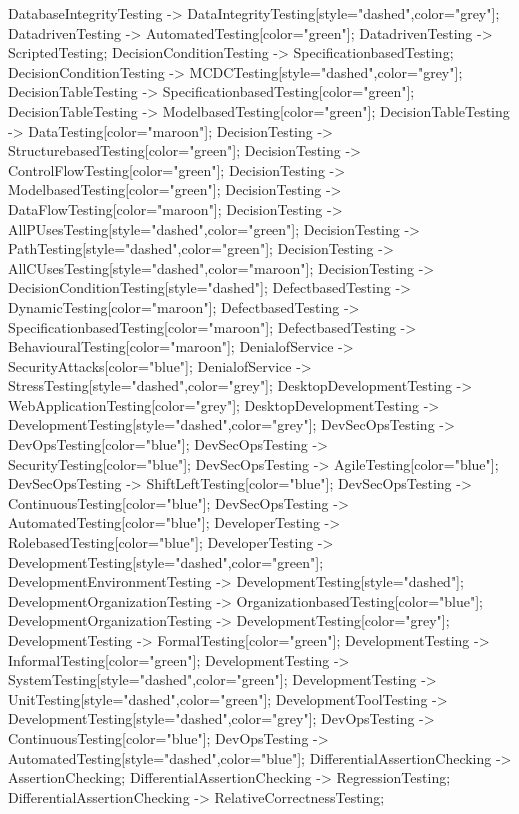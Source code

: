 \documentclass{article}
\begin{document}
{DatabaseIntegrityTesting -> DataIntegrityTesting[style="dashed",color="grey"];
DatadrivenTesting -> AutomatedTesting[color="green"];
DatadrivenTesting -> ScriptedTesting;
DecisionConditionTesting -> SpecificationbasedTesting;
DecisionConditionTesting -> MCDCTesting[style="dashed",color="grey"];
DecisionTableTesting -> SpecificationbasedTesting[color="green"];
DecisionTableTesting -> ModelbasedTesting[color="green"];
DecisionTableTesting -> DataTesting[color="maroon"];
DecisionTesting -> StructurebasedTesting[color="green"];
DecisionTesting -> ControlFlowTesting[color="green"];
DecisionTesting -> ModelbasedTesting[color="green"];
DecisionTesting -> DataFlowTesting[color="maroon"];
DecisionTesting -> AllPUsesTesting[style="dashed",color="green"];
DecisionTesting -> PathTesting[style="dashed",color="green"];
DecisionTesting -> AllCUsesTesting[style="dashed",color="maroon"];
DecisionTesting -> DecisionConditionTesting[style="dashed"];
DefectbasedTesting -> DynamicTesting[color="maroon"];
DefectbasedTesting -> SpecificationbasedTesting[color="maroon"];
DefectbasedTesting -> BehaviouralTesting[color="maroon"];
DenialofService -> SecurityAttacks[color="blue"];
DenialofService -> StressTesting[style="dashed",color="grey"];
DesktopDevelopmentTesting -> WebApplicationTesting[color="grey"];
DesktopDevelopmentTesting -> DevelopmentTesting[style="dashed",color="grey"];
DevSecOpsTesting -> DevOpsTesting[color="blue"];
DevSecOpsTesting -> SecurityTesting[color="blue"];
DevSecOpsTesting -> AgileTesting[color="blue"];
DevSecOpsTesting -> ShiftLeftTesting[color="blue"];
DevSecOpsTesting -> ContinuousTesting[color="blue"];
DevSecOpsTesting -> AutomatedTesting[color="blue"];
DeveloperTesting -> RolebasedTesting[color="blue"];
DeveloperTesting -> DevelopmentTesting[style="dashed",color="green"];
DevelopmentEnvironmentTesting -> DevelopmentTesting[style="dashed"];
DevelopmentOrganizationTesting -> OrganizationbasedTesting[color="blue"];
DevelopmentOrganizationTesting -> DevelopmentTesting[color="grey"];
DevelopmentTesting -> FormalTesting[color="green"];
DevelopmentTesting -> InformalTesting[color="green"];
DevelopmentTesting -> SystemTesting[style="dashed",color="green"];
DevelopmentTesting -> UnitTesting[style="dashed",color="green"];
DevelopmentToolTesting -> DevelopmentTesting[style="dashed",color="grey"];
DevOpsTesting -> ContinuousTesting[color="blue"];
DevOpsTesting -> AutomatedTesting[style="dashed",color="blue"];
DifferentialAssertionChecking -> AssertionChecking;
DifferentialAssertionChecking -> RegressionTesting;
DifferentialAssertionChecking -> RelativeCorrectnessTesting;
}
\end{document}
